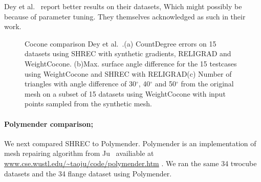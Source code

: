 Dey et al.~\cite{Dey2012,Dey2013} report better results on their datasets, Which might possibly be because of parameter tuning. They themselves acknowledged as such in their work.
\begin{figure}[htb]
	\centering
		\caption{Cocone comparison Dey et al.~\cite{Dey2012,Dey2013}.(a) CountDegree errors on 15 datasets using SHREC with synthetic gradients, RELIGRAD and WeightCocone. (b)Max. surface angle difference for the 15 testcases using WeightCocone and SHREC with RELIGRAD(c) Number of triangles with angle difference of 30$^\circ$, 40$^\circ$ and 50$^\circ$ from the original mesh on a subset of 15 datasets using WeightCocone with  input points sampled from the synthetic mesh.}
		\label{fig:cocone:compare}
\end{figure}
\paragraph{Polymender comparison;}
We next compared SHREC to Polymender. Polymender is an implementation of mesh repairing algorithm from Ju~\cite{j-rrpm-04} availiable at \url{www.cse.wustl.edu/~taoju/code/polymender.htm} \href{http://www.cse.wustl.edu/~taoju/code/polymender.htm}{}. 
We ran the same 34 twocube datasets and the 34 flange dataset using Polymender. 

